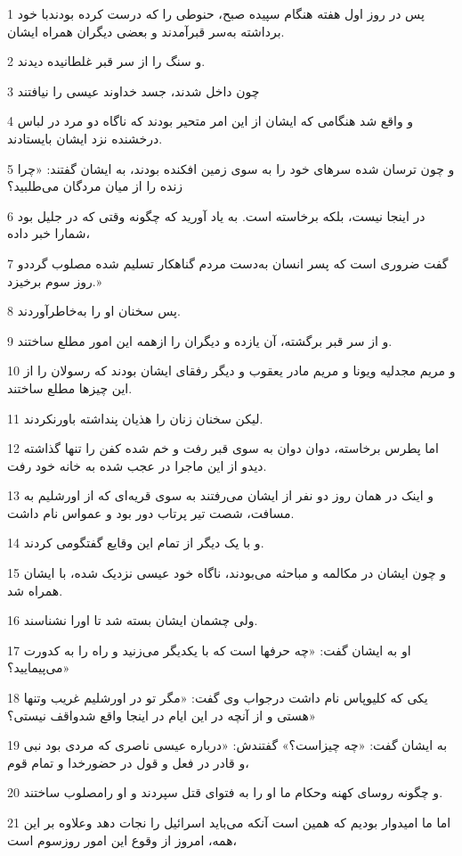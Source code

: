\par 1 پس در روز اول هفته هنگام سپیده صبح، حنوطی را که درست کرده بودندبا خود برداشته به‌سر قبر‌آمدند و بعضی دیگران همراه ایشان.
\par 2 و سنگ را از سر قبر غلطانیده دیدند.
\par 3 چون داخل شدند، جسد خداوند عیسی را نیافتند
\par 4 و واقع شد هنگامی که ایشان از این امر متحیر بودند که ناگاه دو مرد در لباس درخشنده نزد ایشان بایستادند.
\par 5 و چون ترسان شده سرهای خود را به سوی زمین افکنده بودند، به ایشان گفتند: «چرا زنده را از میان مردگان می‌طلبید؟
\par 6 در اینجا نیست، بلکه برخاسته است. به یاد آورید که چگونه وقتی که در جلیل بود شمارا خبر داده،
\par 7 گفت ضروری است که پسر انسان به‌دست مردم گناهکار تسلیم شده مصلوب گرددو روز سوم برخیزد.»
\par 8 پس سخنان او را به‌خاطرآوردند.
\par 9 و از سر قبر برگشته، آن یازده و دیگران را ازهمه این امور مطلع ساختند.
\par 10 و مریم مجدلیه ویونا و مریم مادر یعقوب و دیگر رفقای ایشان بودند که رسولان را از این چیزها مطلع ساختند.
\par 11 لیکن سخنان زنان را هذیان پنداشته باورنکردند.
\par 12 اما پطرس برخاسته، دوان دوان به سوی قبر رفت و خم شده کفن را تنها گذاشته دیدو از این ماجرا در عجب شده به خانه خود رفت.
\par 13 و اینک در همان روز دو نفر از ایشان می‌رفتند به سوی قریه‌ای که از اورشلیم به مسافت، شصت تیر پرتاب دور بود و عمواس نام داشت.
\par 14 و با یک دیگر از تمام این وقایع گفتگومی کردند.
\par 15 و چون ایشان در مکالمه و مباحثه می‌بودند، ناگاه خود عیسی نزدیک شده، با ایشان همراه شد.
\par 16 ولی چشمان ایشان بسته شد تا اورا نشناسند.
\par 17 او به ایشان گفت: «چه حرفها است که با یکدیگر می‌زنید و راه را به کدورت می‌پیمایید؟»
\par 18 یکی که کلیوپاس نام داشت درجواب وی گفت: «مگر تو در اورشلیم غریب وتنها هستی و از آنچه در این ایام در اینجا واقع شدواقف نیستی؟»
\par 19 به ایشان گفت: «چه چیزاست؟» گفتندش: «درباره عیسی ناصری که مردی بود نبی و قادر در فعل و قول در حضورخدا و تمام قوم،
\par 20 و چگونه روسای کهنه وحکام ما او را به فتوای قتل سپردند و او رامصلوب ساختند.
\par 21 اما ما امیدوار بودیم که همین است آنکه می‌باید اسرائیل را نجات دهد وعلاوه بر این همه، امروز از وقوع این امور روزسوم است،
